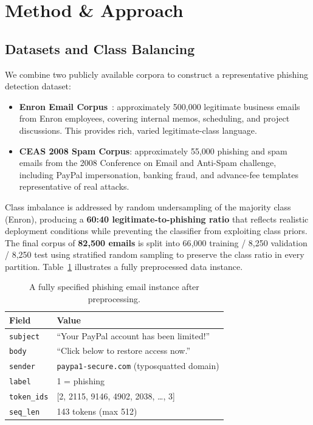 \documentclass[sigconf, nonacm]{acmart}
\begin{document}
\section{Method \& Approach}

\subsection{Datasets and Class Balancing}

We combine two publicly available corpora to construct a
representative phishing detection dataset:

\begin{itemize}[leftmargin=*,noitemsep,topsep=2pt]
  \item \textbf{Enron Email Corpus}~\cite{klimt2004}: approximately
    500{,}000 legitimate business emails from Enron employees,
    covering internal memos, scheduling, and project discussions.
    This provides rich, varied legitimate-class language.
  \item \textbf{CEAS 2008 Spam Corpus}: approximately 55{,}000
    phishing and spam emails from the 2008 Conference on Email and
    Anti-Spam challenge, including PayPal impersonation, banking
    fraud, and advance-fee templates representative of real attacks.
\end{itemize}

Class imbalance is addressed by random undersampling of the majority
class (Enron), producing a \textbf{60:40 legitimate-to-phishing ratio}
that reflects realistic deployment conditions while preventing the
classifier from exploiting class priors.
The final corpus of \textbf{82{,}500 emails} is split into 66{,}000
training / 8{,}250 validation / 8{,}250 test using stratified random
sampling to preserve the class ratio in every partition.
Table~\ref{tab:instance} illustrates a fully preprocessed data instance.

\begin{table}[h]
\centering\small
\caption{A fully specified phishing email instance after preprocessing.}
\label{tab:instance}
\begin{tabular}{@{}p{2.0cm}p{5.2cm}@{}}
\toprule
\textbf{Field} & \textbf{Value} \\
\midrule
\texttt{subject}    & ``Your PayPal account has been limited!'' \\
\texttt{body}       & ``Click below to restore access now.'' \\
\texttt{sender}     & \texttt{paypa1-secure.com} (typosquatted domain) \\
\texttt{label}      & 1 = phishing \\
\texttt{token\_ids} & {[2, 2115, 9146, 4902, 2038, \ldots, 3]} \\
\texttt{seq\_len}   & 143 tokens (max 512) \\
\bottomrule
\end{tabular}
\end{table}
\end{document}
